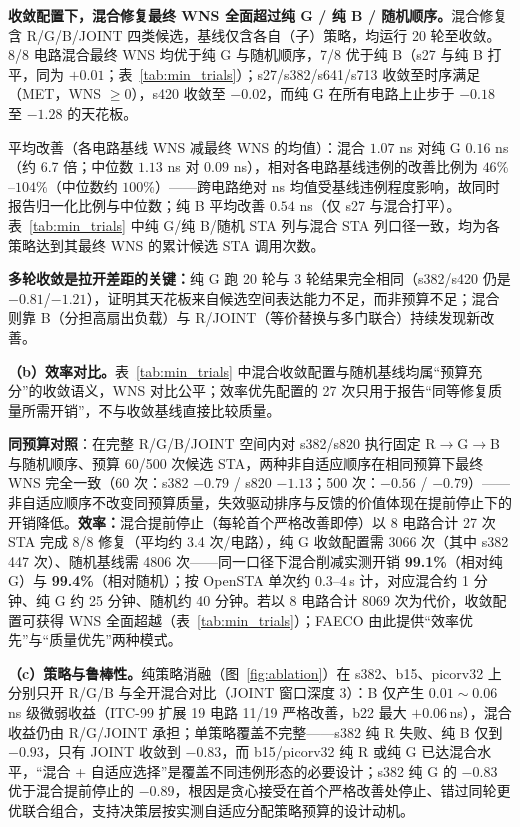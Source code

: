 \documentclass[journal]{IEEEtran}
\begin{document}
\textbf{收敛配置下，混合修复最终 WNS 全面超过纯 G / 纯 B / 随机顺序。}混合修复含 R/G/B/JOINT 四类候选，基线仅含各自（子）策略，均运行 20 轮至收敛。8/8 电路混合最终 WNS 均优于纯 G 与随机顺序，7/8 优于纯 B（s27 与纯 B 打平，同为 $+0.01$；表~\ref{tab:min_trials}）；s27/s382/s641/s713 收敛至时序满足（MET，WNS $\ge 0$），s420 收敛至 $-0.02$，而纯 G 在所有电路上止步于 $-0.18$ 至 $-1.28$ 的天花板。

平均改善（各电路基线 WNS 减最终 WNS 的均值）：混合 $1.07$ ns 对纯 G $0.16$ ns（约 6.7 倍；中位数 $1.13$ ns 对 $0.09$ ns），相对各电路基线违例的改善比例为 $46\%$--$104\%$（中位数约 $100\%$）——跨电路绝对 ns 均值受基线违例程度影响，故同时报告归一化比例与中位数；纯 B 平均改善 $0.54$ ns（仅 s27 与混合打平）。表~\ref{tab:min_trials} 中纯 G/纯 B/随机 STA 列与混合 STA 列口径一致，均为各策略达到其最终 WNS 的累计候选 STA 调用次数。

\textbf{多轮收敛是拉开差距的关键：}纯 G 跑 20 轮与 3 轮结果完全相同（s382/s420 仍是 $-0.81$/$-1.21$），证明其天花板来自候选空间表达能力不足，而非预算不足；混合则靠 B（分担高扇出负载）与 R/JOINT（等价替换与多门联合）持续发现新改善。

\textbf{（b）效率对比。}表~\ref{tab:min_trials} 中混合收敛配置与随机基线均属“预算充分”的收敛语义，WNS 对比公平；效率优先配置的 27 次只用于报告“同等修复质量所需开销”，不与收敛基线直接比较质量。

\textbf{同预算对照}：在完整 R/G/B/JOINT 空间内对 s382/s820 执行固定 R$\rightarrow$G$\rightarrow$B 与随机顺序、预算 60/500 次候选 STA，两种非自适应顺序在相同预算下最终 WNS 完全一致（60 次：s382 $-0.79$ / s820 $-1.13$；500 次：$-0.56$ / $-0.79$）——非自适应顺序不改变同预算质量，失效驱动排序与反馈的价值体现在提前停止下的开销降低。\textbf{效率：}混合提前停止（每轮首个严格改善即停）以 8 电路合计 27 次 STA 完成 8/8 修复（平均约 3.4 次/电路），纯 G 收敛配置需 3066 次（其中 s382 447 次）、随机基线需 4806 次——同一口径下混合削减实测开销 \textbf{99.1\%}（相对纯 G）与 \textbf{99.4\%}（相对随机）；按 OpenSTA 单次约 0.3--4\,s 计，对应混合约 1 分钟、纯 G 约 25 分钟、随机约 40 分钟。若以 8 电路合计 8069 次为代价，收敛配置可获得 WNS 全面超越（表~\ref{tab:min_trials}）；FAECO 由此提供“效率优先”与“质量优先”两种模式。

\textbf{（c）策略与鲁棒性。}纯策略消融（图~\ref{fig:ablation}）在 s382、b15、picorv32 上分别只开 R/G/B 与全开混合对比（JOINT 窗口深度 3）：B 仅产生 $0.01\!\sim\!0.06\,$ns 级微弱收益（ITC-99 扩展 19 电路 11/19 严格改善，b22 最大 $+0.06\,$ns），混合收益仍由 R/G/JOINT 承担；单策略覆盖不完整——s382 纯 R 失败、纯 B 仅到 $-0.93$，只有 JOINT 收敛到 $-0.83$，而 b15/picorv32 纯 R 或纯 G 已达混合水平，“混合 + 自适应选择”是覆盖不同违例形态的必要设计；s382 纯 G 的 $-0.83$ 优于混合提前停止的 $-0.89$，根因是贪心接受在首个严格改善处停止、错过同轮更优联合组合，支持决策层按实测自适应分配策略预算的设计动机。
\end{document}
